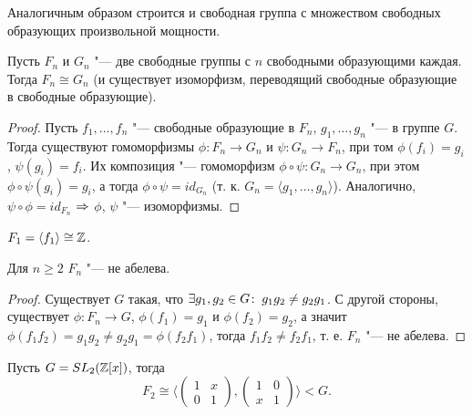 \documentclass[main]{subfiles}
\begin{document}
\begin{remark}
  Аналогичным образом строится и свободная группа с множеством
  свободных образующих произвольной мощности.
\end{remark}

\begin{proposition}
  Пусть $F_n$ и $G_n$ "--- две свободные группы
  с $n$ свободными образующими каждая.
  Тогда $F_n \cong G_n$
  (и существует изоморфизм,
  переводящий свободные образующие в свободные образующие).
\end{proposition}
\begin{proof}
  Пусть $f_1, \dots, f_n$ "--- свободные образующие в $F_n$,
  $g_1, \dots, g_n$ "--- в группе $G$.
  Тогда существуют гомоморфизмы
  $\phi: F_n \to G_n$ и $\psi : G_n \to F_n$,
  при том $\phi(f_i) = g_i$, $\psi(g_i) = f_i$.
  Их композиция "--- гомоморфизм
  $\phi \circ \psi : G_n \to G_n$,
  при этом
  $\phi \circ \psi (g_i) = g_i$, а тогда
  $\phi \circ \psi = id_{G_n}$
  (т. к. $G_n = \langle g_1, \dots, g_n \rangle$).
  Аналогично,
  $\psi \circ \phi = id_{F_n}$
  $\Rightarrow$ $\phi$, $\psi$ "--- изоморфизмы.
\end{proof}

\begin{remark}
  $F_1 = \langle f_1 \rangle \cong \mathbb{Z}$.
\end{remark}

\begin{proposition}
  Для $n \ge 2$ $F_n$ "--- не абелева.
\end{proposition}
\begin{proof}
  Существует $G$ такая, что $\exists g_1, g_2 \in G \colon \:
  g_1 g_2 \ne g_2 g_1$.
  С другой стороны, существует $\phi : F_n \to G$,
  $\phi(f_1) = g_1$ и $\phi(f_2) = g_2$,
  а значит $\phi(f_1 f_2) = g_1 g_2 \ne g_2 g_1 = \phi(f_2 f_1)$,
  тогда \( f_1 f_2 \ne f_2 f_1 \),
  т. е. $F_n$ "--- не абелева.
\end{proof}

\begin{exercise} %
  Пусть $G = SL_2(\mathbb{Z}[x])$, тогда
  $$F_2 \cong \langle
  \begin{pmatrix} 1 & x \\ 0 & 1\end{pmatrix},
    \begin{pmatrix} 1 & 0 \\ x & 1\end{pmatrix}
      \rangle < G.$$
\end{exercise}
\end{document}
